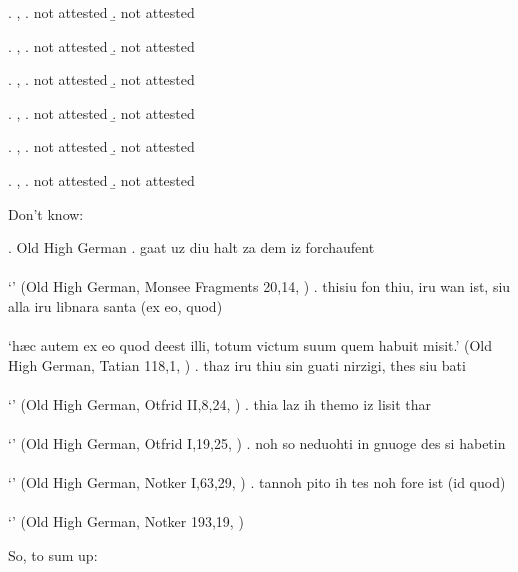 \ex. , 
\a.  not attested
\b.  not attested

\ex. , 
\a.  not attested
\b.  not attested

\ex. , 
\a.  not attested
\b.  not attested

\ex. , 
\a.  not attested
\b.  not attested

\ex. , 
\a.  not attested
\b.  not attested

\ex. , 
\a.  not attested
\b.  not attested


Don't know:

\ex. Old High German
\ag. gaat uz diu halt za dem iz forchaufent\\
 \\
 `' \hfill (Old High German, Monsee Fragments 20,14, \citealt[761]{behaghel1923})
\bg. thisiu fon thiu, iru wan ist, siu alla iru libnara santa (ex eo, quod)\\
 \\
 `hæc autem ex eo quod deest illi, totum victum suum quem habuit misit.' \hfill (Old High German, Tatian 118,1, \citealt[761]{behaghel1923})
\bg. thaz iru thiu sin guati nirzigi, thes siu bati\\
 \\
 `' \hfill (Old High German, Otfrid II,8,24, \citealt[761]{behaghel1923})
\bg. thia laz ih themo iz lisit thar\\
 \\
 `' \hfill (Old High German, Otfrid I,19,25, \citealt[761]{behaghel1923})
\bg. noh so neduohti in gnuoge des si habetin\\
 \\
 `' \hfill (Old High German, Notker I,63,29, \citealt[761]{behaghel1923})
\bg. tannoh pito ih tes noh fore ist (id quod)\\
 \\
 `' \hfill (Old High German, Notker 193,19, \citealt[761]{behaghel1923})

So, to sum up:


